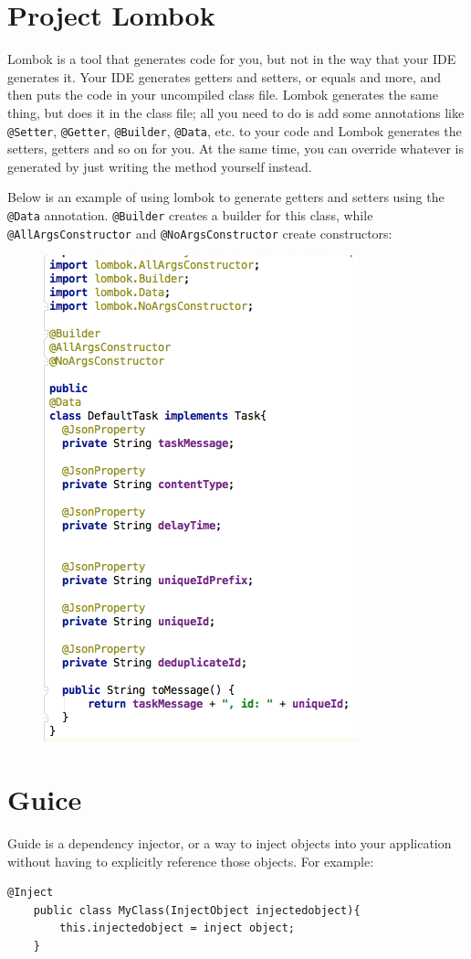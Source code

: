 \documentclass[oneside]{book}
\begin{document}
\section{Project Lombok}
Lombok is a tool that generates code for you, but not in the way that your IDE generates it. Your IDE generates getters and setters, or equals and more, and then puts the code in your uncompiled class file. Lombok generates the same thing, but does it in the class file; all you need to do is add some annotations like \texttt{@Setter}, \texttt{@Getter}, \texttt{@Builder}, \texttt{@Data}, etc. to your code and Lombok generates the setters, getters and so on for you. At the same time, you can override whatever is generated by just writing the method yourself instead.\par
Below is an example of using lombok to generate getters and setters using the \texttt{@Data} annotation. \texttt{@Builder} creates a builder for this class, while \texttt{@AllArgsConstructor} and \texttt{@NoArgsConstructor} create constructors:\par
\begin{figure}[h!]
\centering
	\includegraphics[scale=0.5]{lombok.png}
\end{figure}
\section{Guice}
Guide is a dependency injector, or a way to inject objects into your application without having to explicitly reference those objects. For example:
\begin{lstlisting}
@Inject
	public class MyClass(InjectObject injectedobject){
		this.injectedobject = inject object;	
	}
\end{lstlisting}
\end{document}
